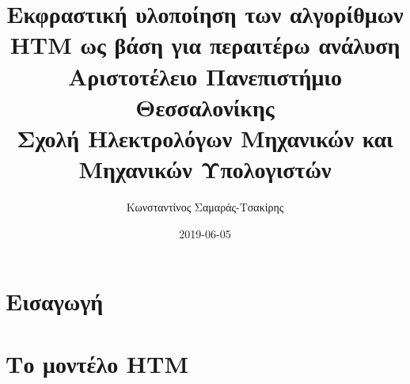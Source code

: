 \documentclass[a4paper,11pt,twoside]{report}
\title{
{Εκφραστική υλοποίηση των αλγορίθμων HTM ως βάση για περαιτέρω ανάλυση}\\
{\large Αριστοτέλειο Πανεπιστήμιο Θεσσαλονίκης}\\
{\large Σχολή Ηλεκτρολόγων Μηχανικών και Μηχανικών Υπολογιστών}
}
\author{Κωνσταντίνος Σαμαράς-Τσακίρης}
\date{2019-06-05}
\begin{document}
\maketitle
%

\tableofcontents{}

\chapter{Εισαγωγή}


\chapter{Το μοντέλο HTM}


\printbibliography
\appendix
\end{document}
